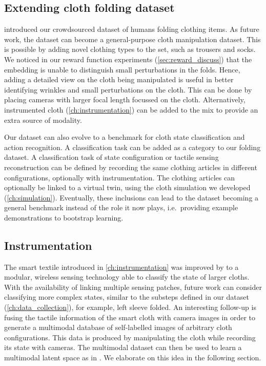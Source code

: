 \documentclass[\home/main.tex]{subfiles}
\begin{document}
\subsection{Extending cloth folding dataset}
 introduced our crowdsourced dataset of humans folding clothing items.
As future work, the dataset can become a general-purpose cloth manipulation dataset. This is possible by adding novel clothing types to the set, such as trousers and socks.
We noticed in our reward function experiments (\cref{sec:reward_discuss}) that the embedding is unable to distinguish small perturbations in the folds. Hence, adding a detailed view on the cloth being manipulated is useful in better identifying wrinkles and small perturbations on the cloth. This can be done by placing cameras with larger focal length focussed on the cloth. Alternatively, instrumented cloth (\cref{ch:instrumentation}) can be added to the mix to provide an extra source of modality.

Our dataset can also evolve to a benchmark for cloth state classification and action recognition.
A classification task can be added as a category to our folding dataset. A classification task of state configuration or tactile sensing reconstruction can be defined by recording the same clothing articles in different configurations, optionally with instrumentation. The clothing articles can optionally be linked to a virtual twin, using the cloth simulation we developed (\cref{ch:simulation}).
Eventually, these inclusions can lead to the dataset becoming a general benchmark instead of the role it now plays, i.e.\ providing example demonstrations to bootstrap learning.

\subsection{Instrumentation}
The smart textile introduced in \cref{ch:instrumentation} was improved by \textcite{Proesmans2022} to a modular, wireless sensing technology able to classify the state of larger cloths. With the availability of linking multiple sensing patches, future work can consider classifying more complex states, similar to the substeps defined in our dataset (\cref{ch:data_collection}), for example, left sleeve folded. An interesting follow-up is fusing the tactile information of the smart cloth with camera images in order to generate a multimodal database of self-labelled images of arbitrary cloth configurations. This data is produced by manipulating the cloth while recording its state with cameras. The multimodal dataset can then be used to learn a multimodal latent space as in \autocite{Lee2019}. We elaborate on this idea in the following section.
\end{document}
